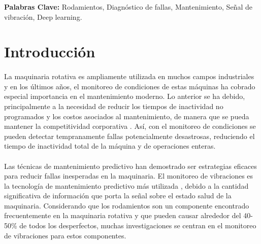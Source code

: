 \documentclass[12pt]{article}
\begin{document}
\noindent
\textbf{Palabras Clave:} Rodamientos, Diagnóstico de fallas, Mantenimiento, Señal de vibración, Deep learning.


\newpage
\renewcommand{\contentsname}{Índice}
\renewcommand{\tablename}{Tabla} 
\tableofcontents
\renewcommand{\figurename}{Figura}
\renewcommand{\refname}{Referencias}
\renewcommand{\listtablename}{Lista de Tablas}
\newpage



\renewcommand{\listfigurename}{Lista de Figuras}
\listoffigures
\listoftables
\newpage


\section{Introducción}

\paragraph{}
La maquinaria rotativa es ampliamente utilizada en muchos campos industriales y en los últimos años, el monitoreo de condiciones de estas máquinas ha cobrado especial importancia en el mantenimiento moderno. Lo anterior se ha debido, principalmente a la necesidad de reducir los tiempos de inactividad no programados y los costos asociados al mantenimiento, de manera que se pueda mantener la competitividad corporativa \cite{seeraa}. Así, con el monitoreo de condiciones se pueden detectar tempranamente fallas potencialmente desastrosas, reduciendo el tiempo de inactividad total de la máquina y de operaciones enteras.

\paragraph{}
Las técnicas de mantenimiento predictivo han demostrado ser estrategias eficaces para reducir fallas inesperadas en la maquinaria. El monitoreo de vibraciones es la tecnología de mantenimiento predictivo más utilizada \cite{zhan}, debido a la cantidad significativa de información que porta la señal sobre el estado salud de la maquinaria. Considerando que los rodamientos son un componente encontrado frecuentemente en la maquinaria rotativa y que pueden causar alrededor del 40-50\% \cite{issam} de todos los desperfectos, muchas investigaciones se centran en el monitoreo de vibraciones para estos componentes.
\end{document}
